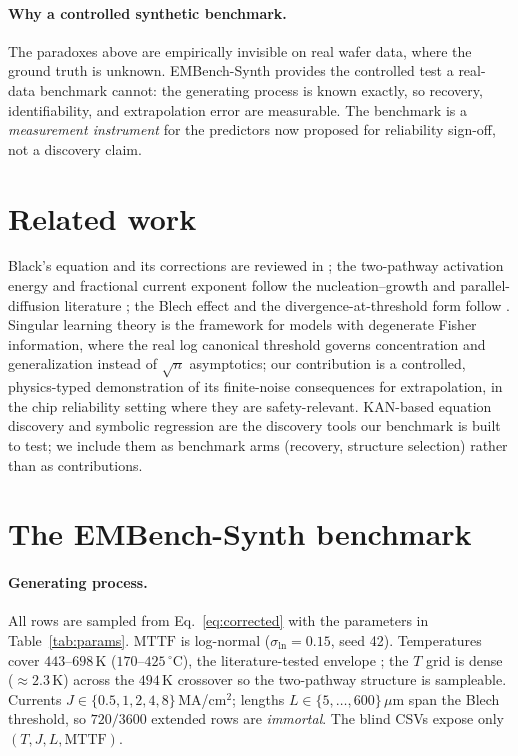 \documentclass{article}
\newcommand{\MTTF}{\mathrm{MTTF}}
\newcommand{\sln}{\sigma_{\ln}}
\begin{document}
\paragraph{Why a controlled synthetic benchmark.} The paradoxes above are
empirically invisible on real wafer data, where the ground truth is unknown.
EMBench-Synth provides the controlled test a real-data benchmark cannot: the
generating process is known exactly, so recovery, identifiability, and
extrapolation error are measurable. The benchmark is a \emph{measurement
instrument} for the predictors now proposed for reliability sign-off, not a
discovery claim.

\section{Related work}

Black's equation and its corrections are reviewed in
\citet{black69,lloyd,hu_em,jedec}; the two-pathway activation energy and
fractional current exponent follow the nucleation--growth and parallel-
diffusion literature \citep{huntington07,rovitto,tu19}; the Blech effect and
the divergence-at-threshold form follow \citet{blech,korhonen93,ogawa01}.
Singular learning theory \citep{watanabe09,watanabe18} is the framework for
models with degenerate Fisher information, where the real log canonical
threshold governs concentration and generalization instead of
$\sqrt{n}$ asymptotics; our contribution is a controlled, physics-typed
demonstration of its finite-noise consequences for extrapolation, in the chip
reliability setting where they are safety-relevant. KAN-based equation discovery
\citep{kan} and symbolic regression \citep{gpsr} are the discovery tools our
benchmark is built to test; we include them as benchmark arms (recovery,
structure selection) rather than as contributions.

\section{The EMBench-Synth benchmark}

\paragraph{Generating process.} All rows are sampled from
Eq.~\eqref{eq:corrected} with the parameters in Table~\ref{tab:params}.
$\MTTF$ is log-normal ($\sln=0.15$, seed 42). Temperatures cover
$443$--$698$\,K ($170$--$425\,^\circ$C), the literature-tested envelope
\citep{irs}; the $T$ grid is dense ($\approx2.3$\,K) across the $494$\,K
crossover so the two-pathway structure is sampleable. Currents
$J\in\{0.5,1,2,4,8\}$\,MA/cm$^2$; lengths $L\in\{5,\dots,600\}\,\mu$m span the
Blech threshold, so $720/3600$ extended rows are \emph{immortal}. The blind
CSVs expose only $(T,J,L,\MTTF)$.
\end{document}
